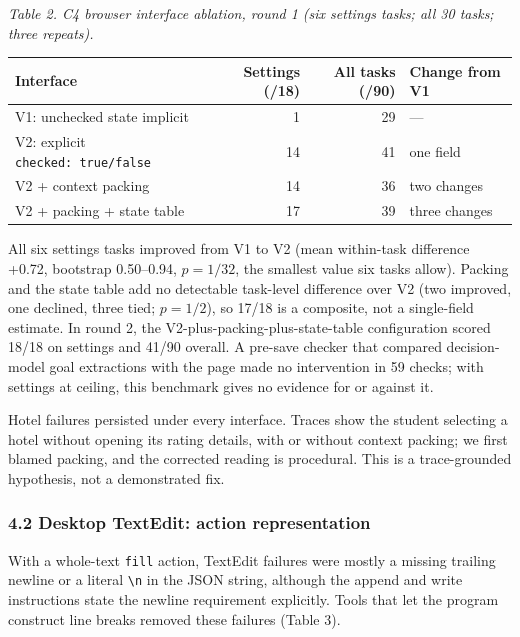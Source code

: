\documentclass[
  10pt,
]{article}
\newcounter{none} %
\begin{document}
\emph{Table 2. C4 browser interface ablation, round 1 (six settings
tasks; all 30 tasks; three repeats).}

{\def\LTcaptype{none} %
\begin{longtable}[]{@{}lrrl@{}}
\toprule\noalign{}
Interface & Settings (/18) & All tasks (/90) & Change from V1 \\
\midrule\noalign{}
\endhead
\bottomrule\noalign{}
\endlastfoot
V1: unchecked state implicit & 1 & 29 & --- \\
V2: explicit \texttt{checked:\ true/false} & 14 & 41 & one field \\
V2 + context packing & 14 & 36 & two changes \\
V2 + packing + state table & 17 & 39 & three changes \\
\end{longtable}
}

All six settings tasks improved from V1 to V2 (mean within-task
difference +0.72, bootstrap 0.50--0.94, \(p=1/32\), the smallest value
six tasks allow). Packing and the state table add no detectable
task-level difference over V2 (two improved, one declined, three tied;
\(p=1/2\)), so 17/18 is a composite, not a single-field estimate. In
round 2, the V2-plus-packing-plus-state-table configuration scored 18/18
on settings and 41/90 overall. A pre-save checker that compared
decision-model goal extractions with the page made no intervention in 59
checks; with settings at ceiling, this benchmark gives no evidence for
or against it.

Hotel failures persisted under every interface. Traces show the student
selecting a hotel without opening its rating details, with or without
context packing; we first blamed packing, and the corrected reading is
procedural. This is a trace-grounded hypothesis, not a demonstrated fix.

\subsubsection{4.2 Desktop TextEdit: action
representation}\label{desktop-textedit-action-representation}

With a whole-text \texttt{fill} action, TextEdit failures were mostly a
missing trailing newline or a literal \texttt{\textbackslash{}n} in the
JSON string, although the append and write instructions state the
newline requirement explicitly. Tools that let the program construct
line breaks removed these failures (Table 3).
\end{document}
